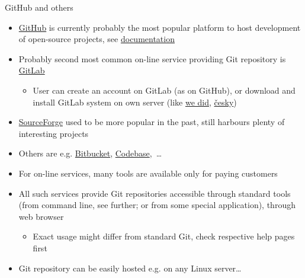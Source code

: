 \documentclass[compress, ucs, xelatex, 11pt, xcolor=svgnames, aspectratio=169,
	hyperref={
		bookmarks=true,
		unicode=true,
		colorlinks=true,
		pdftitle={Linux, command line and MetaCentrum},
		plainpages=false,
		pdfauthor={Vojtech Zeisek},
		pdfsubject={Course about use of Linux command line, writing shell scripts and using MetaCentrum of CESNET},
		pdfcreator={XeLaTeX},
		pdfkeywords={Linux, GNU, BASH, shell, command line, MetaCentrum},
		linkcolor=DarkRed, %
		anchorcolor=DarkBlue, %
		citecolor=Indigo, %
		filecolor=NavyBlue, %
		menucolor=DarkMagenta, %
		urlcolor=DarkBlue, %
		pdftex},
	url={hyphens, lowtilde} %
	]{beamer}
\begin{document}
\begin{frame}{GitHub and others}
	\begin{itemize}
		\item \href{https://github.com/}{GitHub} is currently probably the most popular platform to host development of open-source projects, see \href{https://help.github.com/}{documentation}
		\item Probably second most common on-line service providing Git repository is \href{https://about.gitlab.com/}{GitLab}
		\begin{itemize}
			\item User can create an account on GitLab (as on GitHub), or download and install GitLab system on own server (like \href{https://sorbus.ibot.cas.cz/en/gitlab}{we did}, \href{https://sorbus.ibot.cas.cz/cs/gitlab}{česky})
		\end{itemize}
		\item \href{https://sourceforge.net/}{SourceForge} used to be more popular in the past, still harbours plenty of interesting projects
		\item Others are e.g. \href{https://bitbucket.org/}{Bitbucket}, \href{https://www.codebasehq.com/}{Codebase},~\ldots
		\item For on-line services, many tools are available only for paying customers
		\item All such services provide Git repositories accessible through standard tools (from command line, see further; or from some special application), through web browser
		\begin{itemize}
			\item Exact usage might differ from standard Git, check respective help pages first
		\end{itemize}
		\item Git repository can be easily hosted e.g. on any Linux server\ldots
	\end{itemize}
\end{frame}
\end{document}
